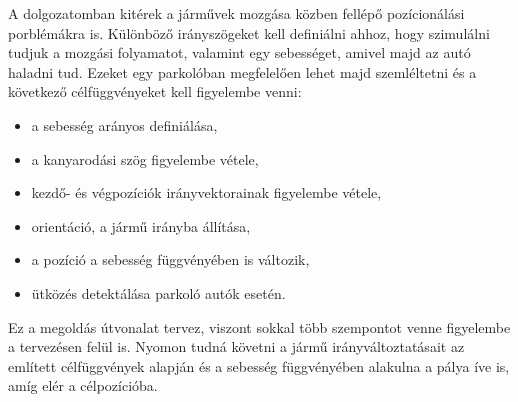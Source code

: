 
A dolgozatomban kitérek a járművek mozgása közben fellépő pozícionálási porblémákra is. Különböző irányszögeket kell definiálni ahhoz, hogy szimulálni tudjuk a mozgási folyamatot, valamint egy sebességet, amivel majd az autó haladni tud. Ezeket egy parkolóban megfelelően lehet majd szemléltetni és a következő célfüggvényeket kell figyelembe venni:
\begin{itemize}
	\item a sebesség arányos definiálása,
	\item a kanyarodási szög figyelembe vétele,
	\item kezdő- és végpozíciók irányvektorainak figyelembe vétele,
	\item orientáció, a jármű irányba állítása,
	\item a pozíció a sebesség függvényében is változik,
	\item ütközés detektálása parkoló autók esetén.
\end{itemize}
Ez a megoldás útvonalat tervez, viszont sokkal több szempontot venne figyelembe a tervezésen felül is. Nyomon tudná követni a jármű irányváltoztatásait az említett célfüggvények alapján és a sebesség függvényében alakulna a pálya íve is, amíg elér a célpozícióba.

